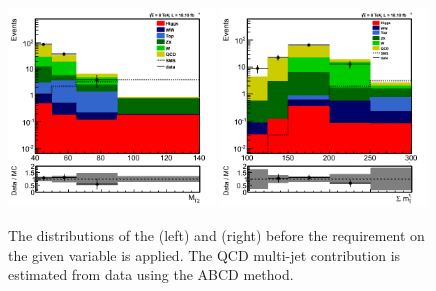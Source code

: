 \begin{figure}[htbp]
\centering
\includegraphics[width=0.49\textwidth]{QCDbginTauTau/Bin1_QCDdatdriven.png}
\includegraphics[width=0.49\textwidth]{QCDbginTauTau/Bin2_QCDdatdriven.png} \\
\caption{The distributions of the \mttwo (left) and \SumMT (right) before the requirement on the given variable
is applied. The QCD multi-jet contribution is estimated from data using the ABCD method.}
\label{fig:5QCDbg}
\end{figure}


